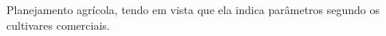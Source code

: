 \newpar Planejamento agrícola, tendo em vista que ela indica parâmetros segundo os cultivares comerciais.